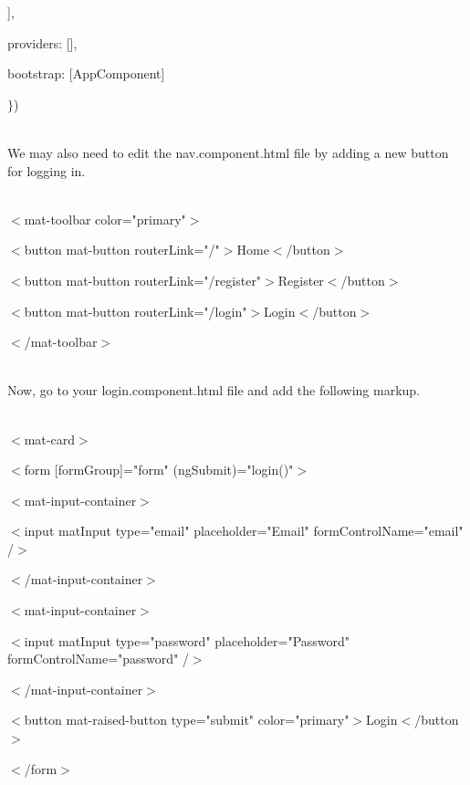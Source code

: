 \documentclass{article}
\begin{document}
\noindent ],

\noindent providers: [],

\noindent bootstrap: [AppComponent]

\noindent $\mathrm{\}}$)

 

\noindent \\ We may also need to edit the nav.component.html file by adding a new button for logging in.

\noindent \\ $\mathrm{<}$mat-toolbar color="primary"$\mathrm{>}$

\noindent $\mathrm{<}$button mat-button routerLink="/"$\mathrm{>}$Home$\mathrm{<}$/button$\mathrm{>}$

\noindent $\mathrm{<}$button mat-button routerLink="/register"$\mathrm{>}$Register$\mathrm{<}$/button$\mathrm{>}$

\noindent $\mathrm{<}$button mat-button routerLink="/login"$\mathrm{>}$Login$\mathrm{<}$/button$\mathrm{>}$

\noindent $\mathrm{<}$/mat-toolbar$\mathrm{>}$

\noindent 

\noindent \\ Now, go to your login.component.html file and add the following markup.

 

\noindent \\ $\mathrm{<}$mat-card$\mathrm{>}$

\noindent $\mathrm{<}$form [formGroup]="form" (ngSubmit)="login()"$\mathrm{>}$

\noindent $\mathrm{<}$mat-input-container$\mathrm{>}$

\noindent $\mathrm{<}$input matInput type="email" placeholder="Email" formControlName="email" /$\mathrm{>}$

\noindent $\mathrm{<}$/mat-input-container$\mathrm{>}$

\noindent $\mathrm{<}$mat-input-container$\mathrm{>}$

\noindent $\mathrm{<}$input matInput type="password" placeholder="Password" formControlName="password" /$\mathrm{>}$

\noindent $\mathrm{<}$/mat-input-container$\mathrm{>}$

\noindent $\mathrm{<}$button mat-raised-button type="submit" color="primary"$\mathrm{>}$Login$\mathrm{<}$/button$\mathrm{>}$

\noindent $\mathrm{<}$/form$\mathrm{>}$
\end{document}
